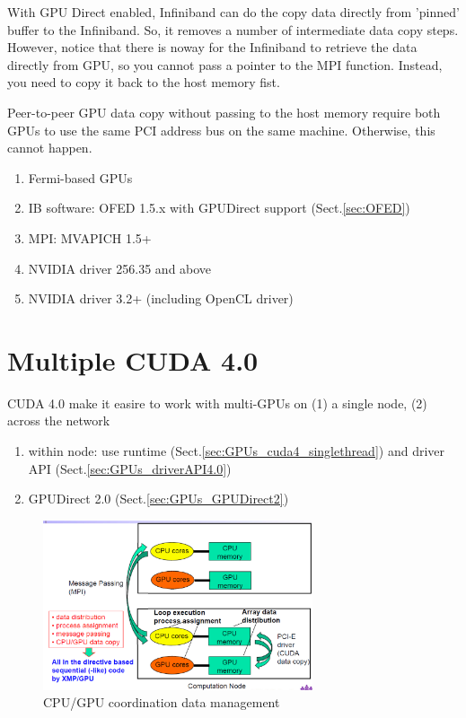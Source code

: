 
With GPU Direct enabled, Infiniband can do the copy data directly from 'pinned'
buffer to the Infiniband. So, it removes a number of intermediate data copy
steps. However, notice that there is noway for the Infiniband to retrieve the
data directly from GPU, so you cannot pass a pointer to the MPI function.
Instead, you need to copy it back to the host memory fist.

Peer-to-peer GPU data copy without passing to the host memory require
both GPUs to use the same PCI address bus on the same
machine. Otherwise, this cannot happen. 

\begin{enumerate}
  \item Fermi-based GPUs
  \item IB software: OFED 1.5.x with GPUDirect support (Sect.\ref{sec:OFED})
  \item MPI: MVAPICH 1.5+
  \item NVIDIA driver 256.35 and above
  \item NVIDIA driver 3.2+ (including OpenCL driver)
\end{enumerate}


\section{Multiple CUDA 4.0 }
\label{sec:multi-GPU_CUDA4.0}

CUDA 4.0 make it easire to work with multi-GPUs on (1) a single node, (2)
across the network
\begin{enumerate}
\item within node: use runtime (Sect.\ref{sec:GPUs_cuda4_singlethread}) and
driver API (Sect.\ref{sec:GPUs_driverAPI4.0})
\item GPUDirect 2.0
(Sect.\ref{sec:GPUs_GPUDirect2})
\end{enumerate}

\begin{figure}[hbt]
  \centerline{\includegraphics[height=5cm,
    angle=0]{./images/multiple_GPU_CPU.eps}}
  \caption{CPU/GPU coordination data management}
  \label{fig:GPU_CPU}
\end{figure}

